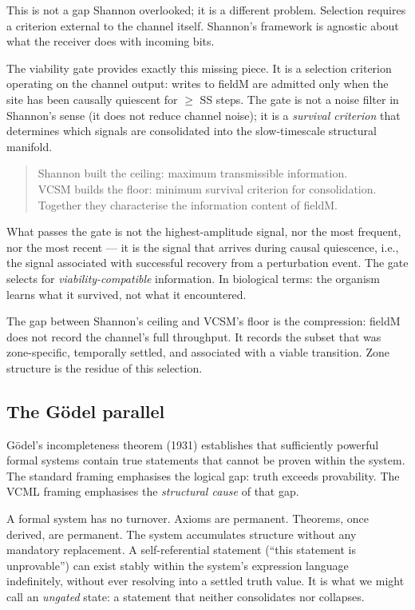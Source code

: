 \documentclass[11pt]{article}
\begin{document}
This is not a gap Shannon overlooked; it is a different problem.
Selection requires a criterion external to the channel itself.
Shannon's framework is agnostic about what the receiver does with incoming bits.

The viability gate provides exactly this missing piece.
It is a selection criterion operating on the channel output:
writes to fieldM are admitted only when the site has been causally quiescent for
$\geq$ SS steps.
The gate is not a noise filter in Shannon's sense (it does not reduce channel noise);
it is a \emph{survival criterion} that determines which signals are consolidated into
the slow-timescale structural manifold.

\begin{quote}
  Shannon built the ceiling: maximum transmissible information.\\
  VCSM builds the floor: minimum survival criterion for consolidation.\\
  Together they characterise the information content of fieldM.
\end{quote}

What passes the gate is not the highest-amplitude signal, nor the most frequent,
nor the most recent --- it is the signal that arrives during causal quiescence,
i.e., the signal associated with successful recovery from a perturbation event.
The gate selects for \emph{viability-compatible} information.
In biological terms: the organism learns what it survived, not what it encountered.

The gap between Shannon's ceiling and VCSM's floor is the compression:
fieldM does not record the channel's full throughput.
It records the subset that was zone-specific, temporally settled, and
associated with a viable transition.
Zone structure is the residue of this selection.

\subsection{The G\"{o}del parallel}

G\"{o}del's incompleteness theorem (1931) establishes that sufficiently powerful
formal systems contain true statements that cannot be proven within the system.
The standard framing emphasises the logical gap: truth exceeds provability.
The VCML framing emphasises the \emph{structural cause} of that gap.

A formal system has no turnover.
Axioms are permanent.
Theorems, once derived, are permanent.
The system accumulates structure without any mandatory replacement.
A self-referential statement (``this statement is unprovable'') can exist
stably within the system's expression language indefinitely,
without ever resolving into a settled truth value.
It is what we might call an \emph{ungated} state:
a statement that neither consolidates nor collapses.
\end{document}
